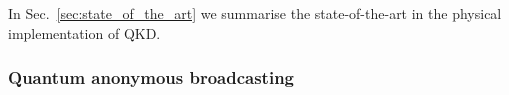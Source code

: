 In Sec.~\ref{sec:state_of_the_art} we summarise the state-of-the-art in the physical implementation of QKD.

%
%

\subsubsection{Quantum anonymous broadcasting} \label{sec:anon_broad} 

\cite{Wehner}


